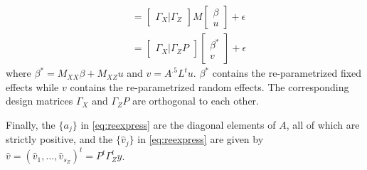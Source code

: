 \documentclass[ejs]{imsart}
\begin{document}
\begin{enumerate}
\begin{equation*}
\begin{split}
        &= \begin{bmatrix} \Gamma_X | \Gamma_Z \end{bmatrix} M \begin{bmatrix} \beta \\ u \end{bmatrix} + \epsilon\\
        &= \begin{bmatrix} \Gamma_X | \Gamma_Z P \end{bmatrix} \begin{bmatrix} \beta^* \\ v \end{bmatrix} + \epsilon
      \end{split}
    \end{equation*}
    where $\beta^* = M_{XX}\beta + M_{XZ}u$ and $v = A^{.5}L^t u$.  $\beta^*$ contains the re-parametrized
    fixed effects while $v$ contains the re-parametrized random effects.  The corresponding design matrices
    $\Gamma_X$ and $\Gamma_Z P$ are orthogonal to each other.
\end{enumerate}
Finally, the $\{a_j\}$ in \eqref{eq:reexpress} are the diagonal elements of $A$, all of which are strictly positive, and the $\{\hat v_j\}$ in \eqref{eq:reexpress} are given by $\hat v = (\hat v_1, \dots, \hat v_{s_Z})^t = P^t \Gamma_Z^t y$.
\end{document}
